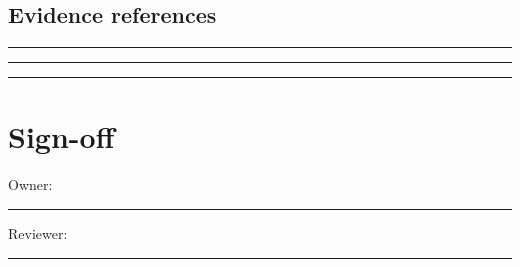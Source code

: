 \documentclass[11pt]{article}
\begin{document}
\subsection{Evidence references}
\noindent\rule{\linewidth}{0.35pt}\par\vspace{0.22in}
\noindent\rule{\linewidth}{0.35pt}\par\vspace{0.22in}
\noindent\rule{\linewidth}{0.35pt}\par\vspace{0.18in}

\section{Sign-off}
Owner: \rule{0.38\linewidth}{0.4pt}\hfill Reviewer: \rule{0.38\linewidth}{0.4pt}\par
\end{document}
